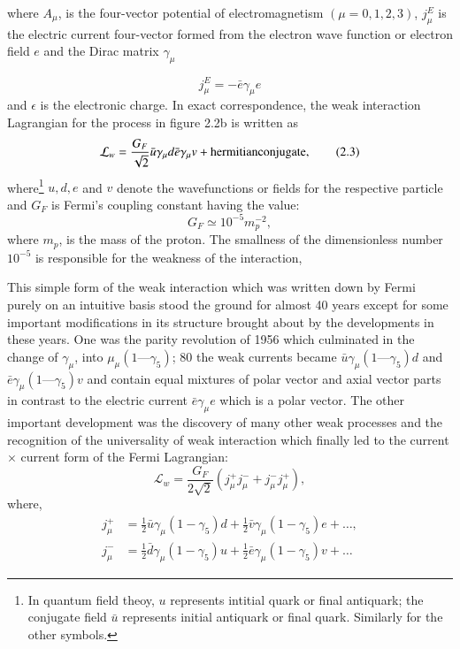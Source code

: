 where $A_{\mu}$, is the four-vector potential of electromagnetism $(\mu = 0,1,2,3)$, $j_{\mu}^{E}$ is the electric current four-vector formed from the electron wave function or electron field $e$ and the Dirac matrix $\gamma_{\mu}$ 
 
\begin{equation*}
j_{\mu}^{E}= -\bar{e}\gamma_{\mu} e\tag{2.2}
\end{equation*}
and $\epsilon$ is the electronic charge. In exact correspondence, the weak interaction Lagrangian for the process in figure 2.2b is written as 
\begin{equation*}
\mathcal{L}_{w} = \frac{G_{F}}{\sqrt{2}}\bar{u}\gamma_{\mu} d \bar{e}\gamma_{\mu} v + {\rm hermitian conjugate},\tag{2.3}
\end{equation*}
where\footnote{In quantum field theoy, $u$ represents intitial quark or final antiquark; the conjugate field $\bar{u}$ represents initial antiquark or final quark. Similarly for the other symbols.} $u, d, e$ and $v$ denote the wavefunctions or fields for the respective particle and $G_{F}$ is Fermi’s coupling constant having the value: 
$$
G_{F}\simeq 10^{-5}m_{p}^{-2},
$$
where $m_{p}$, is the mass of the proton. The smallness of the dimensionless number $10^{-5}$ is responsible for the weakness of the interaction, 

This simple form of the weak interaction which was written down by Fermi purely on an intuitive basis stood the ground for almost 40 years except for some important modifications in its structure brought about by the developments in these years. One was the parity revolution of 1956 which culminated in the change of $\gamma_{\mu}$, into $\mu_{\mu}(1 — \gamma_{5})$; 80 the weak currents became $\bar{u}\gamma_{\mu}(1 — \gamma_{5})d$ and $\bar{e}\gamma_{\mu}(1 — \gamma_{5})v$ and contain equal mixtures of polar vector and axial vector parts in contrast to the electric current $\bar{e}\gamma_{\mu}e$ which is a polar vector. The other important development was the discovery of many other weak processes and the recognition of the universality of weak interaction which finally led to the current $\times$ current form of the Fermi Lagrangian: 
\begin{equation*}
\mathcal{L}_{w}= \frac{G_{F}}{2 \sqrt{2}} (j^{+}_{\mu} j^{-}_{\mu} + j^{-}_{\mu}j^{+}_{\mu}),\tag{2.4}
\end{equation*}
where,
\begin{align*}
j^{+}_{\mu} &= \frac{1}{2} \bar{u}\gamma_{\mu}(1-\gamma_{5})d + \frac{1}{2} \bar{v}\gamma_{\mu}(1-\gamma_{5})e+\ldots,\tag{2.5}\\
j^{-}_{\mu}&= \frac{1}{2} \bar{d}\gamma_{\mu}(1-\gamma_{5})u + \frac{1}{2} \bar{e}\gamma_{\mu}(1-\gamma_{5})v+\ldots\tag{2.6}
\end{align*}

